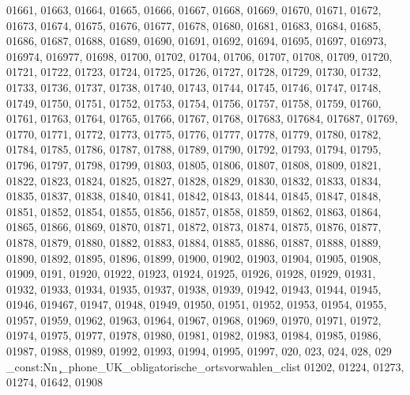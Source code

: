 {01661,
01663,
01664,
01665,
01666,
01667,
01668,
01669,
01670,
01671,
01672,
01673,
01674,
01675,
01676,
01677,
01678,
01680,
01681,
01683,
01684,
01685,
01686,
01687,
01688,
01689,
01690,
01691,
01692,
01694,
01695,
01697,
016973,
016974,
016977,
01698,
01700,
01702,
01704,
01706,
01707,
01708,
01709,
01720,
01721,
01722,
01723,
01724,
01725,
01726,
01727,
01728,
01729,
01730,
01732,
01733,
01736,
01737,
01738,
01740,
01743,
01744,
01745,
01746,
01747,
01748,
01749,
01750,
01751,
01752,
01753,
01754,
01756,
01757,
01758,
01759,
01760,
01761,
01763,
01764,
01765,
01766,
01767,
01768,
017683,
017684,
017687,
01769,
01770,
01771,
01772,
01773,
01775,
01776,
01777,
01778,
01779,
01780,
01782,
01784,
01785,
01786,
01787,
01788,
01789,
01790,
01792,
01793,
01794,
01795,
01796,
01797,
01798,
01799,
01803,
01805,
01806,
01807,
01808,
01809,
01821,
01822,
01823,
01824,
01825,
01827,
01828,
01829,
01830,
01832,
01833,
01834,
01835,
01837,
01838,
01840,
01841,
01842,
01843,
01844,
01845,
01847,
01848,
01851,
01852,
01854,
01855,
01856,
01857,
01858,
01859,
01862,
01863,
01864,
01865,
01866,
01869,
01870,
01871,
01872,
01873,
01874,
01875,
01876,
01877,
01878,
01879,
01880,
01882,
01883,
01884,
01885,
01886,
01887,
01888,
01889,
01890,
01892,
01895,
01896,
01899,
01900,
01902,
01903,
01904,
01905,
01908,
01909,
0191,
01920,
01922,
01923,
01924,
01925,
01926,
01928,
01929,
01931,
01932,
01933,
01934,
01935,
01937,
01938,
01939,
01942,
01943,
01944,
01945,
01946,
019467,
01947,
01948,
01949,
01950,
01951,
01952,
01953,
01954,
01955,
01957,
01959,
01962,
01963,
01964,
01967,
01968,
01969,
01970,
01971,
01972,
01974,
01975,
01977,
01978,
01980,
01981,
01982,
01983,
01984,
01985,
01986,
01987,
01988,
01989,
01992,
01993,
01994,
01995,
01997,
020,
023,
024,
028,
029}
\clist_const:Nn \c_phone_UK_obligatorische_ortsvorwahlen_clist {01202,
01224,
01273,
01274,
01642,
01908}
